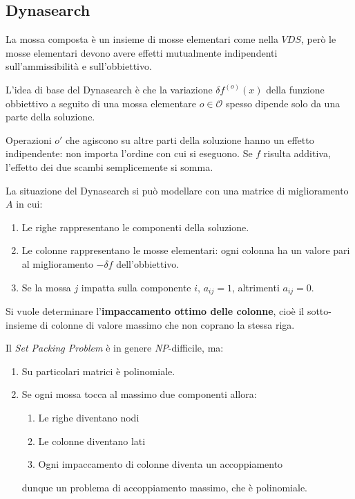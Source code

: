 \documentclass[\main/main.tex]{subfiles}
\begin{document}
\subsection{Dynasearch}
\begin{definition}
    La mossa composta è un insieme di mosse elementari come nella \(VDS\), però le mosse elementari devono avere effetti mutualmente indipendenti sull'ammissibilità e sull'obbiettivo.
\end{definition}
\begin{observation}
    L'idea di base del Dynasearch è che la variazione \(\delta f^{(o)}(x)\) della funzione obbiettivo a seguito di una mossa elementare \(o \in \mathcal{O}\) spesso dipende solo da una parte della soluzione.

    Operazioni \(o'\) che agiscono su altre parti della soluzione hanno un effetto indipendente: non importa l'ordine con cui si eseguono. Se  \(f\) risulta additiva, l'effetto dei due scambi semplicemente si somma.
\end{observation}
\begin{observation}
    La situazione del Dynasearch si può modellare con una matrice di miglioramento \(A\) in cui:
    \begin{enumerate}
        \item Le righe rappresentano le componenti della soluzione.
        \item Le colonne rappresentano le mosse elementari: ogni colonna ha un valore pari al miglioramento \(-\delta f\) dell'obbiettivo.
        \item Se la mossa \(j\) impatta sulla componente \(i\), \(a_{ij} = 1\), altrimenti \(a_{ij} = 0\).
    \end{enumerate}
    
    Si vuole determinare l'\textbf{impaccamento ottimo delle colonne}, cioè il sotto-insieme di colonne di valore massimo che non coprano la stessa riga.
\end{observation}

\begin{observation}
    Il \textit{Set Packing Problem} è in genere \textit{NP}-difficile, ma:
    \begin{enumerate}
        \item Su particolari matrici è polinomiale.
        \item Se ogni mossa tocca al massimo due componenti allora:
        \begin{enumerate}
            \item Le righe diventano nodi
            \item Le colonne diventano lati
            \item Ogni impaccamento di colonne diventa un accoppiamento
        \end{enumerate}
        dunque un problema di accoppiamento massimo, che è polinomiale.
    \end{enumerate}
\end{observation}
\clearpage
\end{document}
